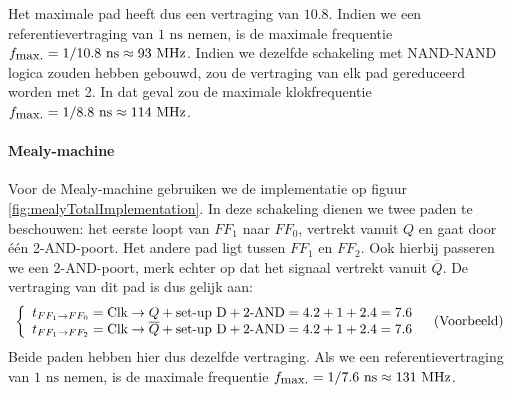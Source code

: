Het maximale pad heeft dus een vertraging van $10.8$. Indien we een referentievertraging van $1\mbox{ ns}$ nemen, is de maximale frequentie $f_{\mbox{\small{max.}}}=1/10.8\mbox{ ns}\approx 93\mbox{ MHz}$. Indien we dezelfde schakeling met NAND-NAND logica zouden hebben gebouwd, zou de vertraging van elk pad gereduceerd worden met 2. In dat geval zou de maximale klokfrequentie $f_{\mbox{\small{max.}}}=1/8.8\mbox{ ns}\approx 114\mbox{ MHz}$.
\paragraph{Mealy-machine}
Voor de Mealy-machine gebruiken we de implementatie op figuur \ref{fig:mealyTotalImplementation}. In deze schakeling dienen we twee paden te beschouwen: het eerste loopt van $FF_1$ naar $FF_0$, vertrekt vanuit $Q$ en gaat door \'e\'en 2-AND-poort. Het andere pad ligt tussen $FF_1$ en $FF_2$. Ook hierbij passeren we een 2-AND-poort, merk echter op dat het signaal vertrekt vanuit $\overline{Q}$. De vertraging van dit pad is dus gelijk aan:
\begin{equation}
\begin{array}{ll}
\left\{\begin{array}{l}
t_{\small{FF_1\rightarrow FF_0}}=\mbox{Clk}\rightarrow Q+\mbox{set-up D}+\mbox{2-AND}=4.2+1+2.4=7.6\\
t_{\small{FF_1\rightarrow FF_2}}=\mbox{Clk}\rightarrow \overline{Q}+\mbox{set-up D}+\mbox{2-AND}=4.2+1+2.4=7.6
\end{array}\right.&\mbox{(Voorbeeld)}
\end{array}
\end{equation}
Beide paden hebben hier dus dezelfde vertraging. Als we een referentievertraging van $1\mbox{ ns}$ nemen, is de maximale frequentie $f_{\mbox{\small{max.}}}=1/7.6\mbox{ ns}\approx 131\mbox{ MHz}$.
